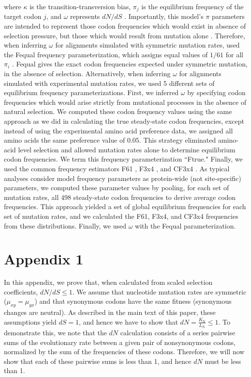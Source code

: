 \documentclass{pnastwo}
\newcommand{\xline}[0]{\noindent\underline{\makebox[0.15cm][l]{}}}
\begin{document}
\begin{article}
where $\kappa$ is the transition-transversion bias, $\pi_j$ is the equilibrium frequency of the target codon $j$, and $\omega$ represents $dN/dS$ \cite{GoldmanYang1994,NielsenYang1998}. Importantly, this model's $\pi$ parameters are intended to represent those codon frequencies which would exist in absence of selection pressure, but those which would result from mutation alone \cite{GoldmanYang1994,MuseGaut1994,YN00,Yang2006}. Therefore, when inferring $\omega$ for alignments simulated with symmetric mutation rates, used the F\xline equal frequency parameterization, which assigns equal values of $1/61$ for all $\pi_i$ \cite{Yang2006}. F\xline equal gives the exact codon frequencies expected under symmetric mutation, in the absence of selection. Alternatively, when inferring $\omega$ for alignments simulated with experimental mutation rates, we used 5 different sets of equilibrium frequency parameterizations. First, we inferred $\omega$ by specifying codon frequencies which would arise strictly from mutational processes in the absence of natural selection. We computed these codon frequency values using the same approach as we did in calculating the true steady-state codon frequencies, except instead of using the experimental amino acid preference data, we assigned all amino acids the same preference value of $0.05$. This strategy eliminated amino-acid level selection and allowed mutation rates alone to determine equilibrium codon frequencies. We term this frequency parameterization ``Ftrue." Finally, we used the common frequency estimators F61 \cite{GoldmanYang1994}, F3x4 \cite{MuseGaut1994}, and CF3x4 \cite{Pond2010}. As typical analyses consider model frequency parameters as protein-wide (not site-specific) parameters, we computed these parameter values by pooling, for each set of mutation rates, all 498 steady-state codon frequencies to derive average codon frequencies. This approach yielded a set of global equilibrium frequencies for each set of mutation rates, and we calculated the F61, F3x4, and CF3x4 frequencies from these distributions. Finally, we used $\omega$ with the F\xline equal parameterization.


\section*{Appendix 1}
In this appendix, we prove that, when calculated from scaled selection coefficients, $dN/dS \leq 1$. We assume that nucleotide mutation rates are symmetric ($\mu_{xy} = \mu_{yx}$) and that synonymous codons have the same fitness (synonymous changes are neutral). As described in the main text of this paper, these assumptions yield $dS = 1$, and hence we have to show that $dN = 	\frac{K_\text{N}}{L_\text{N}} \leq 1$. To demonstrate this, we note that the $dN$ calculation consists of a series pairwise sums of the evolutionary rate between a given pair of nonsynonymous codons, normalized by the sum of the frequencies of these codons. Therefore, we will now show that each of these pairwise sums is less than 1, and hence $dN$ must be less than 1.


\end{article}
\end{document}
